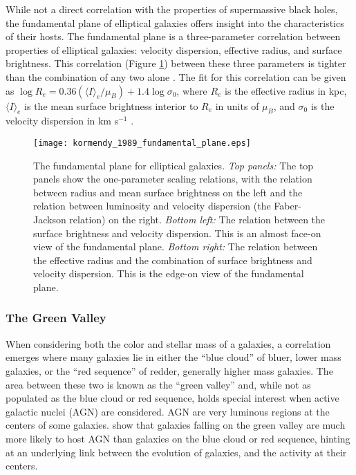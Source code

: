While not a direct correlation with the properties of supermassive black holes, the fundamental plane of elliptical galaxies offers insight into the characteristics of their hosts.  The fundamental plane is a three-parameter correlation between properties of elliptical galaxies:  velocity dispersion, effective radius, and surface brightness.  This correlation (Figure \ref{fig:fundamental_plane}) between these three parameters is tighter than the combination of any two alone \citep{djorgovski_1987}.  The fit for this correlation can be given as $\log R_{e} = 0.36(\langle I \rangle_{e} / \mu_{B}) + 1.4 \log \sigma_{0}$, where $R_{e}$ is the effective radius in kpc, $\langle I \rangle_{e}$ is the mean surface brightness interior to $R_{e}$ in units of $\mu_{B}$, and $\sigma_{0}$ is the velocity dispersion in km s$^{-1}$ \citep{binney_merrifield_1998}.

\begin{figure}[tp]
\centering
\texttt{[image: kormendy\_1989\_fundamental\_plane.eps]}
\caption[The fundamental plane for elliptical galaxies]{\footnotesize The fundamental plane for elliptical galaxies.  \textit{Top panels:} The top panels show the one-parameter scaling relations, with the relation between radius and mean surface brightness on the left and the relation between luminosity and velocity dispersion (the Faber-Jackson relation) on the right.  \textit{Bottom left:} The relation between the surface brightness and velocity dispersion.  This is an almost face-on view of the fundamental plane.  \textit{Bottom right:} The relation between the effective radius and the combination of surface brightness and velocity dispersion.  This is the edge-on view of the fundamental plane.  \citep{kormendy_1989}}
\label{fig:fundamental_plane}
\end{figure}


\subsubsection{The Green Valley}

When considering both the color and stellar mass of a galaxies, a correlation emerges where many galaxies lie in either the ``blue cloud'' of bluer, lower mass galaxies, or the ``red sequence'' of redder, generally higher mass galaxies.  The area between these two is known as the ``green valley'' and, while not as populated as the blue cloud or red sequence, holds special interest when active galactic nuclei (AGN) are considered.  AGN are very luminous regions at the centers of some galaxies.  \citet{schawinski_2010} show that galaxies falling on the green valley are much more likely to host AGN than galaxies on the blue cloud or red sequence, hinting at an underlying link between the evolution of galaxies, and the activity at their centers.

